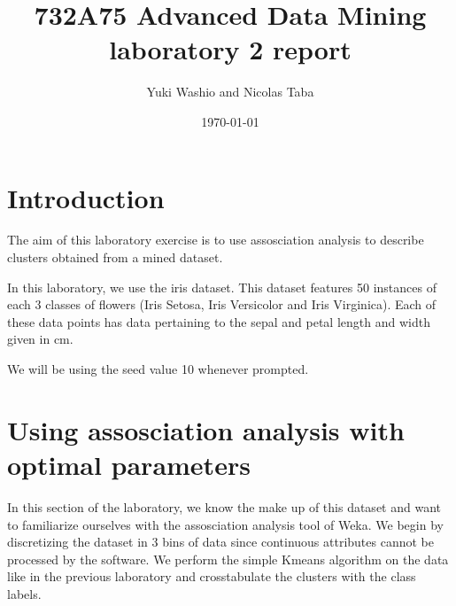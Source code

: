 \documentclass[letterpaper,12pt]{article}
\begin{document}
\title{732A75 Advanced Data Mining laboratory 2 report}
\author{Yuki Washio and Nicolas Taba}
\date{\today}
\maketitle



\section{Introduction}

The aim of this laboratory exercise is to use assosciation analysis to describe clusters obtained from a mined dataset.

In this laboratory, we use the iris dataset. This dataset features 50 instances of each 3 classes of flowers (Iris Setosa, Iris Versicolor and Iris Virginica). Each of these data points has data pertaining to the sepal and petal length and width given in cm.

We will be using the seed value 10 whenever prompted.


\section{Using assosciation analysis with optimal parameters}

In this section of the laboratory, we know the make up of this dataset and want to familiarize ourselves with the assosciation analysis tool of Weka. We begin by discretizing the dataset in 3 bins of data since continuous attributes cannot be processed by the software. We perform the simple Kmeans algorithm on the data like in the previous laboratory and crosstabulate the clusters with the class labels.
\end{document}
